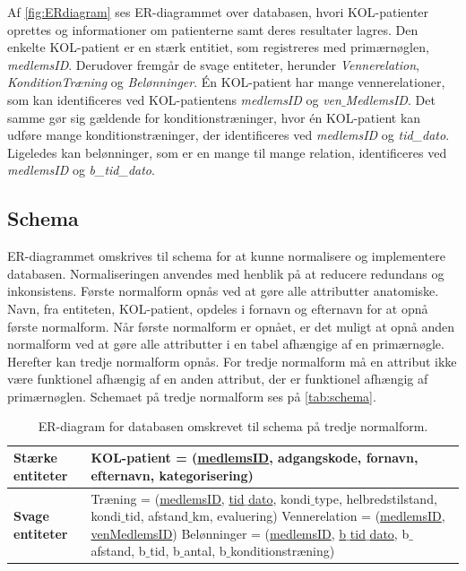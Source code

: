 \newpage
\noindent
Af \autoref{fig:ERdiagram} ses ER-diagrammet over databasen, hvori KOL-patienter oprettes og informationer om patienterne samt deres resultater lagres. Den enkelte KOL-patient er en stærk entitiet, som registreres med primærnøglen, \textit{medlemsID}. Derudover fremgår de svage entiteter, herunder \textit{Vennerelation}, \textit{KonditionTræning} og \textit{Belønninger}. Én KOL-patient har mange vennerelationer, som kan identificeres ved KOL-patientens \textit{medlemsID} og \textit{ven$\_$MedlemsID}. Det samme gør sig gældende for konditionstræninger, hvor én KOL-patient kan udføre mange konditionstræninger, der identificeres ved \textit{medlemsID} og \textit{tid\_dato}. Ligeledes kan belønninger, som er en mange til mange relation, identificeres ved \textit{medlemsID} og \textit{b\_tid\_dato}.

\subsection*{Schema}
ER-diagrammet omskrives til schema for at kunne normalisere og implementere databasen. Normaliseringen anvendes med henblik på at reducere redundans og inkonsistens.
Første normalform opnås ved at gøre alle attributter anatomiske. Navn, fra entiteten, KOL-patient, opdeles i fornavn og efternavn for at opnå første normalform. Når første normalform er opnået, er det muligt at opnå anden normalform ved at gøre alle attributter i en tabel afhængige af en primærnøgle. Herefter kan tredje normalform opnås. For tredje normalform må en attribut ikke være funktionel afhængig af en anden attribut, der er funktionel afhængig af primærnøglen. Schemaet på tredje normalform ses på \autoref{tab:schema}.

\begin{table} [H]
	\centering
  \begin{tabular}{ | l | p{12cm} |} \hline
     \textbf{Stærke entiteter} & KOL-patient = (\underline{medlemsID}, adgangskode, fornavn, efternavn, kategorisering) \\ \hline
 	\textbf{Svage entiteter} & Træning = (\underline{medlemsID}, \underline{tid$\_$dato}, kondi$\_$type, helbredstilstand, kondi$\_$tid, afstand$\_$km, evaluering)
 \newline Vennerelation = (\underline{medlemsID}, \underline{venMedlemsID})
\newline Belønninger = (\underline{medlemsID}, \underline{b$\_$tid$\_$dato}, b$\_$afstand, b$\_$tid, b$\_$antal, b$\_$konditionstræning)\\ \hline
    \end{tabular}
    \caption{ER-diagram for databasen omskrevet til schema på tredje normalform.}
    \label{tab:schema}
\end{table}

